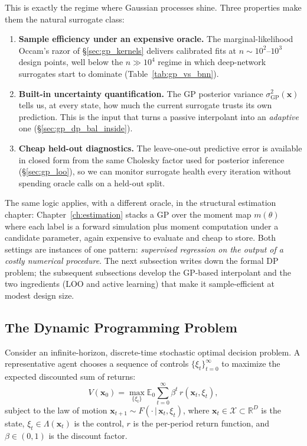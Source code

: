 \documentclass[11pt,a4paper]{report}
\newcommand{\x}{\bm{x}}
\newcommand{\R}{\mathbb{R}}
\begin{document}
This is exactly the regime where Gaussian processes shine.  Three properties make them the natural surrogate class:

\begin{enumerate}[itemsep=2pt]
\item \textbf{Sample efficiency under an expensive oracle.}  The marginal-likelihood Occam's razor of \S\ref{sec:gp_kernels} delivers calibrated fits at $n \sim 10^2$--$10^3$ design points, well below the $n \gg 10^4$ regime in which deep-network surrogates start to dominate (Table~\ref{tab:gp_vs_bnn}).
\item \textbf{Built-in uncertainty quantification.}  The GP posterior variance $\sigma_\mathrm{GP}^2(\x)$ tells us, at every state, how much the current surrogate trusts its own prediction.  This is the input that turns a passive interpolant into an \emph{adaptive} one (\S\ref{sec:gp_dp_bal_inside}).
\item \textbf{Cheap held-out diagnostics.}  The leave-one-out predictive error is available in closed form from the same Cholesky factor used for posterior inference (\S\ref{sec:gp_loo}), so we can monitor surrogate health every iteration without spending oracle calls on a held-out split.
\end{enumerate}

The same logic applies, with a different oracle, in the structural estimation chapter: Chapter~\ref{ch:estimation} stacks a GP over the moment map $m(\theta)$ where each label is a forward simulation plus moment computation under a candidate parameter, again expensive to evaluate and cheap to store.  Both settings are instances of one pattern: \emph{supervised regression on the output of a costly numerical procedure}.  The next subsection writes down the formal DP problem; the subsequent subsections develop the GP-based interpolant and the two ingredients (LOO and active learning) that make it sample-efficient at modest design size.

\subsection{The Dynamic Programming Problem}

Consider an infinite-horizon, discrete-time stochastic optimal decision problem.  A representative agent chooses a sequence of controls $\{\xi_t\}_{t=0}^\infty$ to maximize the expected discounted sum of returns:
\begin{equation}
V(\x_0) = \max_{\{\xi_t\}} \mathbb{E}_0 \sum_{t=0}^\infty \beta^t\, r(\x_t, \xi_t),
\label{eq:dp_objective}
\end{equation}
subject to the law of motion $\x_{t+1} \sim F(\cdot\,|\,\x_t, \xi_t)$, where $\x_t \in \mathcal{X} \subset \R^D$ is the state, $\xi_t \in \Lambda(\x_t)$ is the control, $r$ is the per-period return function, and $\beta \in (0,1)$ is the discount factor.
\end{document}
